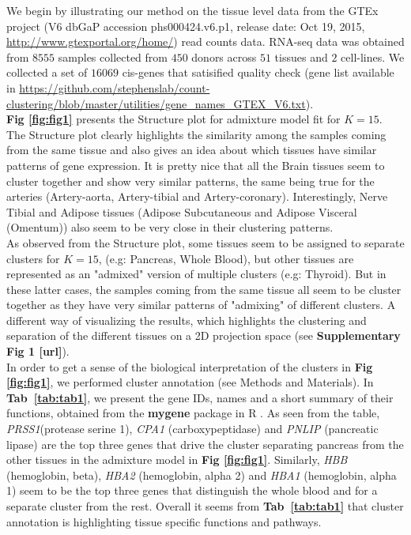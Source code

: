 We begin by illustrating our method on the tissue level data from the  GTEx project (V6 dbGaP accession phs000424.v6.p1, release date: Oct 19, 2015, \url{http://www.gtexportal.org/home/}) read counts data.  RNA-seq data was obtained from $8555$ samples collected from $450$ donors across $51$ tissues and $2$ cell-lines. We collected a set of $16069$ cis-genes that satisified quality check (gene list available in \url{https://github.com/stephenslab/count-clustering/blob/master/utilities/gene_names_GTEX_V6.txt}).  \\[1 pt]
 \textbf{Fig \ref{fig:fig1}} presents the Structure plot for admixture model fit for $K=15$. The Structure plot clearly highlights the similarity among the samples coming from the same tissue and also gives an idea about which tissues have similar patterns of gene expression. It is  pretty nice that all the Brain tissues seem to cluster together and show very similar patterns, the same being true for the arteries (Artery-aorta, Artery-tibial and Artery-coronary). Interestingly, Nerve Tibial  and Adipose tissues (Adipose Subcutaneous and Adipose Visceral (Omentum)) also seem to be very close in their clustering patterns. \\[1 pt]
 As observed from the Structure plot, some tissues seem to be assigned to separate clusters for $K=15$, (e.g: Pancreas, Whole Blood), but other tissues are represented as an "admixed" version of multiple clusters (e.g: Thyroid). But in these latter cases, the samples coming from the same tissue all seem to be cluster together as they have very similar patterns of "admixing" of different clusters. A different way of visualizing the results, which highlights the clustering and separation of the different tissues on a 2D projection space (see \textbf{Supplementary Fig 1 [url]}). \\[1 pt]
 In order to get a sense of the biological interpretation of the clusters in  \textbf{Fig \ref{fig:fig1}}, we performed cluster annotation (see Methods and Materials). In \textbf{Tab~\ref{tab:tab1}}, we present the gene IDs, names and a short summary of their functions, obtained from the \textbf{mygene} package in R \cite{Thompson2014}. As seen from the table, \textit{PRSS1}(protease serine 1), \textit{CPA1} (carboxypeptidase) and \textit{PNLIP} (pancreatic lipase) are the  top three genes that drive the cluster separating pancreas from the other tissues in the admixture model in \textbf{Fig \ref{fig:fig1}}. Similarly, \textit{HBB} (hemoglobin, beta), \textit{HBA2} (hemoglobin, alpha 2) and \textit{HBA1} (hemoglobin, alpha 1) seem to be the top three genes that distinguish the whole blood and for a separate cluster from the rest. Overall it seems from \textbf{Tab~\ref{tab:tab1}} that cluster annotation is highlighting tissue specific functions and pathways.\\[2 pt]


